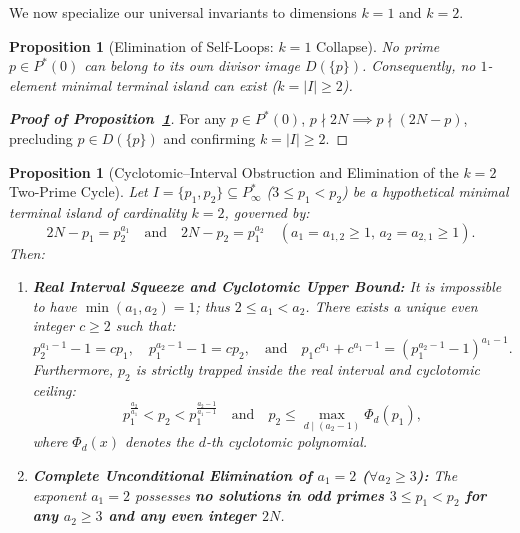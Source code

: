 \documentclass[11pt,a4paper]{article}
\newtheorem{proposition}[theorem]{Proposition}
\theoremstyle{definition}
\begin{document}
We now specialize our universal invariants to dimensions $k = 1$ and $k = 2$.

\begin{proposition}[Elimination of Self-Loops: $k=1$ Collapse]
\label{prop:k1_collapse}
No prime $p \in P^*(0)$ can belong to its own divisor image $D(\{p\})$. Consequently, no $1$-element minimal terminal island can exist ($k = |I| \ge 2$).
\end{proposition}
\begin{proof}[\textbf{Proof of Proposition~\ref{prop:k1_collapse}}]
For any $p \in P^*(0)$, $p \nmid 2N \implies p \nmid (2N - p)$, precluding $p \in D(\{p\})$ and confirming $k = |I| \ge 2$.
\end{proof}

\begin{proposition}[Cyclotomic--Interval Obstruction and Elimination of the $k=2$ Two-Prime Cycle]
\label{prop:k2_collapse}
Let $I = \{p_1, p_2\} \subseteq P^*_\infty$ ($3 \le p_1 < p_2$) be a hypothetical minimal terminal island of cardinality $k = 2$, governed by:
\begin{equation}
\label{eq:k2_system_def}
2N - p_1 = p_2^{a_1} \quad \text{and} \quad 2N - p_2 = p_1^{a_2} \quad (a_1 = a_{1,2} \ge 1, \, a_2 = a_{2,1} \ge 1).
\end{equation}
Then:
\begin{enumerate}
    \item \textbf{Real Interval Squeeze and Cyclotomic Upper Bound:} It is impossible to have $\min(a_1, a_2) = 1$; thus $2 \le a_1 < a_2$. There exists a unique even integer $c \ge 2$ such that:
    \begin{equation}
    \label{eq:k2_c_def}
    p_2^{a_1 - 1} - 1 = c p_1, \quad p_1^{a_2 - 1} - 1 = c p_2, \quad \text{and} \quad p_1 c^{a_1} + c^{a_1 - 1} = (p_1^{a_2 - 1} - 1)^{a_1 - 1}.
    \end{equation}
    Furthermore, $p_2$ is strictly trapped inside the real interval and cyclotomic ceiling:
    \begin{equation}
    \label{eq:k2_interval_cyclotomic}
    p_1^{\frac{a_2}{a_1}} < p_2 < p_1^{\frac{a_2 - 1}{a_1 - 1}} \quad \text{and} \quad p_2 \le \max_{d \mid (a_2 - 1)} \Phi_d(p_1),
    \end{equation}
    where $\Phi_d(x)$ denotes the $d$-th cyclotomic polynomial.
    \item \textbf{Complete Unconditional Elimination of $a_1 = 2$ ($\forall a_2 \ge 3$):} The exponent $a_1 = 2$ possesses \textbf{no solutions in odd primes $3 \le p_1 < p_2$ for any $a_2 \ge 3$ and any even integer $2N$}.

\end{enumerate}
\end{proposition}
\end{document}
